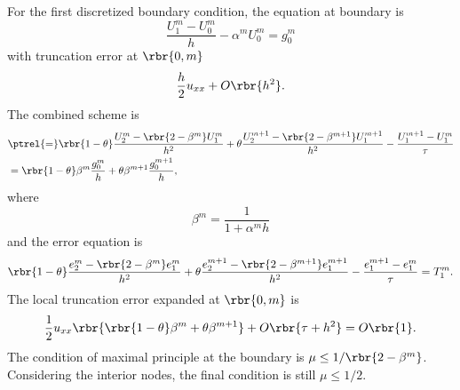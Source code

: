 \documentclass[english, nochinese]{pnote}
\begin{document}
For the first discretized boundary condition, the equation at boundary is
\begin{equation}
\frac{ U_1^m - U_0^m }{h} - \alpha^m U_0^m = g_0^m
\end{equation}
with truncation error at $ \rbr{ 0, m } $
\begin{equation}
\frac{h}{2} u_{ x x } + O \rbr{h^2}.
\end{equation}
The combined scheme is
\begin{equation}
\begin{split}
&\ptrel{=} \rbr{ 1 - \theta } \frac{ U_2^m - \rbr{ 2 - \beta^m } U_1^m }{h^2} + \theta \frac{ U_2^{ m + 1 } - \rbr{ 2 - \beta^{ m + 1 } } U_1^{ m + 1 } }{h^2} - \frac{ U_1^{ m + 1 } - U_1^m }{\tau} \\
&= \rbr{ 1 - \theta } \beta^m \frac{g_0^m}{h} + \theta \beta^{ m + 1 } \frac{g_0^{ m + 1 }}{h},
\end{split}
\end{equation}
where
\begin{equation}
\beta^m = \frac{1}{ 1 + \alpha^m h }
\end{equation}
and the error equation is
\begin{equation}
\rbr{ 1 - \theta } \frac{ e_2^m - \rbr{ 2 - \beta^m } e_1^m }{h^2} + \theta \frac{ e_2^{ m + 1 } - \rbr{ 2 - \beta^{ m + 1 } } e_1^{ m + 1 } }{h^2} - \frac{ e_1^{ m + 1 } - e_1^m }{\tau} = T_1^m.
\end{equation}
The local truncation error expanded at $ \rbr{ 0, m } $ is
\begin{equation}
\frac{1}{2} u_{ x x } \rbr{ \rbr{ 1 - \theta } \beta^m + \theta \beta^{ m + 1 } } + O \rbr{ \tau + h^2 } = O \rbr{1}.
\end{equation}
The condition of maximal principle at the boundary is $ \mu \le 1 / \rbr{ 2 - \beta^m } $. Considering the interior nodes, the final condition is still $ \mu \le 1 / 2 $.
\end{document}
